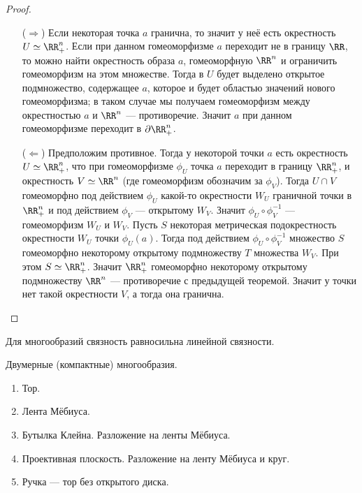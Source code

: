 \documentclass[12pt,a4paper]{article}
\begin{document}
    \begin{proof}
        \begin{itemize}
            \item[($\Rightarrow$)] Если некоторая точка $a$ гранична, то значит у неё есть окрестность $U \simeq \RR^n_+$. Если при данном гомеоморфизме $a$ переходит не в границу $\RR$, то можно найти окрестность образа $a$, гомеоморфную $\RR^n$ и ограничить гомеоморфизм на этом множестве. Тогда в $U$ будет выделено открытое подмножество, содержащее $a$, которое и будет областью значений нового гомеоморфизма; в таком случае мы получаем гомеоморфизм между окрестностью $a$ и $\RR^n$ --- противоречие. Значит $a$ при данном гомеоморфизме переходит в $\partial \RR^n_+$.
            \item[($\Leftarrow$)] Предположим противное. Тогда у некоторой точки $a$ есть окрестность $U \simeq \RR^n_+$, что при гомеоморфизме $\phi_U$ точка $a$ переходит в границу $\RR^n_+$, и окрестность $V \simeq \RR^n$ (где гомеоморфизм обозначим за $\phi_V$). Тогда $U \cap V$ гомеоморфно под действием $\phi_U$ какой-то окрестности $W_U$ граничной точки в $\RR^n_+$ и под действием $\phi_V$ --- открытому $W_V$. Значит $\phi_U \circ \phi_V^{-1}$ --- гомеоморфизм $W_U$ и $W_V$. Пусть $S$ некоторая метрическая подокрестность окрестности $W_U$ точки $\phi_U(a)$. Тогда под действием $\phi_U \circ \phi_V^{-1}$ множество $S$ гомеоморфно некоторому открытому подмножеству $T$ множества $W_V$. При этом $S \simeq \RR^n_+$. Значит $\RR^n_+$ гомеоморфно некоторому открытому подмножеству $\RR^n$ --- противоречие с предыдущей теоремой. Значит у точки нет такой окрестности $V$, а тогда она гранична.
        \end{itemize}
    \end{proof}

    \begin{remark}
        Для многообразий связность равносильна линейной связности.
    \end{remark}

    \begin{example}
        Двумерные (компактные) многообразия.
        \begin{enumerate}
            \item Тор.
            \item Лента Мёбиуса.
            \item Бутылка Клейна. Разложение на ленты Мёбиуса.
            \item Проективная плоскость. Разложение на ленту Мёбиуса и круг.
            \item Ручка --- тор без открытого диска.
        \end{enumerate}
    \end{example}
\end{document}
